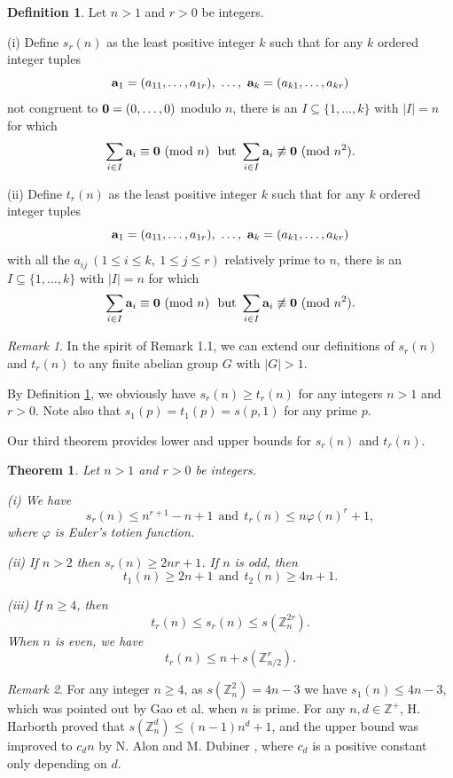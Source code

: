 \documentclass[11pt,reqno]{amsart}
\def\pmod #1{\ ({\rm{mod}}\ #1)}
\def\Z{\mathbb Z}
\def\t{\text}
\def\ls{\leqslant}
\def\gs{\geqslant}
\def\se {\subseteq}
\def\eq{\equiv}
\theoremstyle{plain}
\newtheorem{theorem}{Theorem}
\theoremstyle{definition}
\newtheorem{definition}{Definition}
\theoremstyle{remark}
\newtheorem{remark}{Remark}
\begin{document}
\begin{definition} \label{Def1.2} Let $n>1$ and $r>0$ be integers.

{\rm (i)} Define $s_r(n)$ as the least positive integer $k$ such that for any $k$ ordered integer tuples
$${\bf a}_1=(a_{11},\ldots,a_{1r}),\ \ldots,\ {\bf a}_k=(a_{k1},\ldots,a_{kr})$$
not congruent to ${\bf 0}=(0,\ldots,0)$ modulo $n$, there is an $I\se\{1,\ldots,k\}$ with $|I|=n$
for which $$\sum_{i\in I}{\bf a}_i\eq{\bf 0}\pmod n
\ \ \t{but}\ \sum_{i\in I}{\bf a}_i\not\eq{\bf 0}\pmod {n^2}.$$

{\rm (ii)} Define $t_r(n)$ as the least positive integer $k$ such that for any $k$ ordered integer tuples
$${\bf a}_1=(a_{11},\ldots,a_{1r}),\ \ldots,\ {\bf a}_k=(a_{k1},\ldots,a_{kr})$$
with all the $a_{ij}\ (1\ls i\ls k,\ 1\ls j\ls r)$ relatively prime to $n$, there is an $I\se\{1,\ldots,k\}$ with $|I|=n$ for which $$\sum_{i\in I}{\bf a}_i\eq{\bf 0}\pmod n
\ \ \t{but}\ \sum_{i\in I}{\bf a}_i\not\eq{\bf 0}\pmod {n^2}.$$
\end{definition}

\begin{remark} In the spirit of Remark 1.1, we can extend our definitions of $s_r(n)$ and $t_r(n)$
to any finite abelian group $G$ with $|G|>1$.
\end{remark}

By Definition \ref{Def1.2}, we obviously have $s_r(n)\gs t_r(n)$ for any integers $n>1$ and $r>0$.
Note also that $s_1(p)=t_1(p)=s(p,1)$ for any prime $p$.
\medskip



Our third theorem provides lower and upper bounds for $s_r(n)$ and $t_r(n)$.

\begin{theorem}\label{Th-bound} Let $n>1$ and $r>0$ be integers.

{\rm (i)} We have
\begin{equation}\label{st<=} s_r(n)\ls n^{r+1}-n+1\ \ \t{and}\ \ t_r(n)\ls n\varphi(n)^r+1,
\end{equation}
where $\varphi$ is Euler's totien function.

{\rm (ii)} If $n>2$ then $s_r(n)\gs 2nr+1$. If $n$ is odd, then
\begin{equation}\label{t12} t_1(n)\gs 2n+1\ \ \t{and}\ \  t_2(n)\gs4n+1.
\end{equation}

{\rm (iii)} If $n\gs4$, then
\begin{equation}t_r(n)\ls s_r(n)\ls s(\Z_n^{2r}).
\end{equation}
When $n$ is even, we have
\begin{equation}\label{t<=}t_r(n)\ls n+s(\Z_{n/2}^r).
\end{equation}
\end{theorem}
\begin{remark} For any integer $n\gs4$, as $s(\Z_n^2)=4n-3$ we have $s_1(n)\ls 4n-3$,
which was pointed out by Gao et al. \cite{G26} when $n$ is prime.
For any $n,d\in\Z^+$, H. Harborth \cite{H} proved that $s(\Z_n^d)\ls (n-1)n^d+1$,
and the upper bound was improved to $c_d n$ by N. Alon and M. Dubiner \cite{AD}, where $c_d$
is a positive constant only depending on $d$.
\end{remark}
\end{document}
